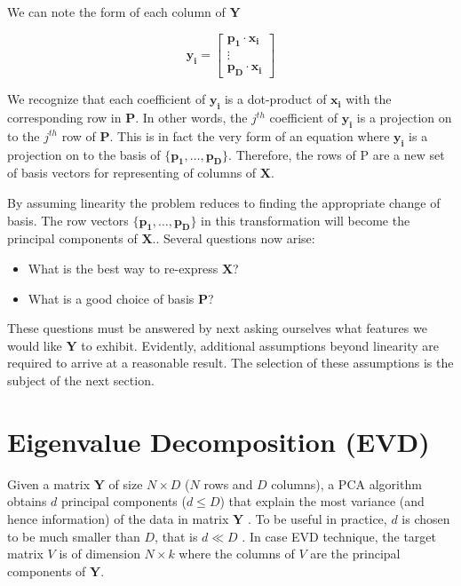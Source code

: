 \newpage We can note the form of each column of  $\pmb{Y}$

$$\pmb{y_i} = 
\left[
\begin{array}{c}
\pmb{p_1 \cdot x_i}\\
\pmb{\vdots}\\
\pmb{p_D \cdot x_i}
\end{array}
\right]
$$

We recognize that each coefficient of $\pmb{y_i}$ is a dot-product of $\pmb{x_i}$ with the corresponding row in $\pmb{P}$. In other words, the $j^{th}$ coefficient of $\pmb{y_i}$ is a projection on to the $j^{th}$ row of $\pmb{P}$. This is in fact the very form of an equation where $\pmb{y_i}$ is a projection on to the basis of $\{\pmb{p_1, \hdots, p_D }\}$. Therefore, the rows of P are a new set of basis vectors for representing of columns of $\pmb{X}$.

By assuming linearity the problem reduces to finding the appropriate change of basis. The row vectors $\{\pmb{p_1, \hdots, p_D }\}$ in this transformation will become the principal components of $\pmb{X}$.. Several questions now arise:

\begin{itemize}
\item What is the best way to re-express $\pmb{X}$?
\item What is a good choice of basis $\pmb{P}$?
\end{itemize}

These questions must be answered by next asking ourselves what features we would like $\pmb{Y}$ to exhibit. Evidently, additional assumptions beyond linearity are required to arrive at a reasonable result. The selection of these assumptions is the subject of the next section.



\section{Eigenvalue Decomposition (EVD)}
Given a matrix $\textbf{Y}$ of size $N \times D$ ($N$ rows and $D$ columns), a PCA algorithm obtains $d$ principal components ($d \leq D$) that explain the most variance (and hence information) of the data in matrix $\textbf{Y}$ \cite{pca,kraska}. To be useful in practice, $d$ is chosen to be much smaller than $D$, that is $d \ll D$ . In case EVD technique, the target matrix $V$ is of dimension $N \times k$ where the columns of $V$ are the principal components of $\textbf{Y}$. 

